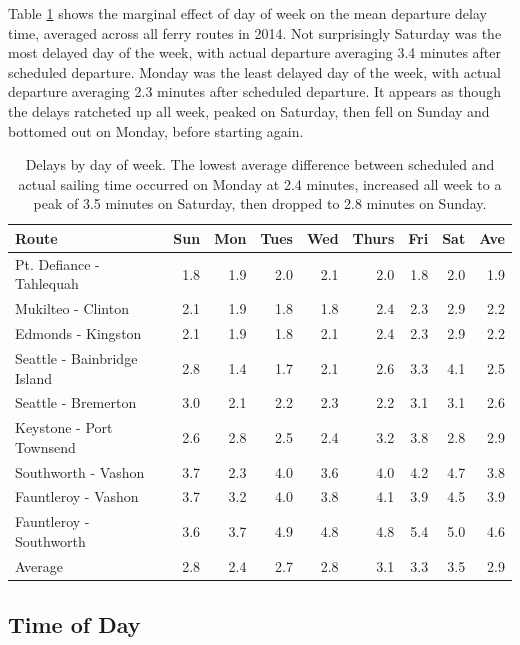 \documentclass[11pt, letterpaper]{article}
\begin{document}
Table \ref{weekday} shows the marginal effect of day of week on the mean departure delay time, averaged across all ferry routes in 2014. Not surprisingly Saturday was the most delayed day of the week, with actual departure averaging 3.4 minutes after scheduled departure. Monday was the least delayed day of the week, with actual departure averaging 2.3 minutes after scheduled departure. It appears as though the delays ratcheted up all week, peaked on Saturday, then fell on Sunday and bottomed out on Monday, before starting again.


\begin{table}[ht]
\centering
\begin{tabular}{lrrrrrrr|r}
  \hline
 Route & Sun & Mon & Tues & Wed & Thurs & Fri & Sat & Ave \\ 
  \hline
Pt. Defiance - Tahlequah & 1.8 & 1.9 & 2.0 & 2.1 & 2.0 & 1.8 & 2.0 & 1.9 \\ 
 Mukilteo - Clinton & 2.1 & 1.9 & 1.8 & 1.8 & 2.4 & 2.3 & 2.9 & 2.2 \\ 
 Edmonds - Kingston & 2.1 & 1.9 & 1.8 & 2.1 & 2.4 & 2.3 & 2.9 & 2.2 \\ 
 Seattle - Bainbridge Island & 2.8 & 1.4 & 1.7 & 2.1 & 2.6 & 3.3 & 4.1 & 2.5 \\ 
 Seattle - Bremerton & 3.0 & 2.1 & 2.2 & 2.3 & 2.2 & 3.1 & 3.1 & 2.6 \\ 
 Keystone - Port Townsend & 2.6 & 2.8 & 2.5 & 2.4 & 3.2 & 3.8 & 2.8 & 2.9 \\ 
 Southworth - Vashon & 3.7 & 2.3 & 4.0 & 3.6 & 4.0 & 4.2 & 4.7 & 3.8 \\ 
Fauntleroy - Vashon & 3.7 & 3.2 & 4.0 & 3.8 & 4.1 & 3.9 & 4.5 & 3.9 \\ 
Fauntleroy - Southworth & 3.6 & 3.7 & 4.9 & 4.8 & 4.8 & 5.4 & 5.0 & 4.6 \\ 
\hline
 Average  & 2.8 & 2.4 & 2.7 & 2.8 & 3.1 & 3.3 & 3.5 & 2.9 \\ 
   \hline
\end{tabular}
\caption{Delays by day of week. The lowest average difference between scheduled and actual sailing time occurred on Monday at 2.4 minutes, increased all week to a peak of 3.5 minutes on Saturday, then dropped to 2.8 minutes on Sunday.}
\label{weekday}
\end{table}



\subsection*{Time of Day}
\end{document}
